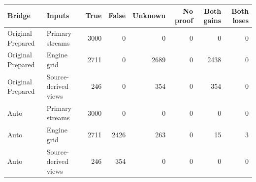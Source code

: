 \begin{tabular}{llrrrrrr}
\toprule
Bridge & Inputs & True & False & Unknown & No proof & Both gains & Both loses \\
\midrule
Original Prepared & Primary streams & 3000 & 0 & 0 & 0 & 0 & 0 \\
Original Prepared & Engine grid & 2711 & 0 & 2689 & 0 & 2438 & 0 \\
Original Prepared & Source-derived views & 246 & 0 & 354 & 0 & 354 & 0 \\
Auto & Primary streams & 3000 & 0 & 0 & 0 & 0 & 0 \\
Auto & Engine grid & 2711 & 2426 & 263 & 0 & 15 & 3 \\
Auto & Source-derived views & 246 & 354 & 0 & 0 & 0 & 0 \\
\bottomrule
\end{tabular}
